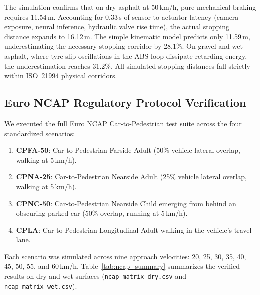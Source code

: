 \documentclass[3p,twocolumn]{elsarticle}
\begin{document}
The simulation confirms that on dry asphalt at 50\,km/h, pure mechanical braking requires 11.54\,m. Accounting for 0.33\,s of sensor-to-actuator latency (camera exposure, neural inference, hydraulic valve rise time), the actual stopping distance expands to 16.12\,m. The simple kinematic model predicts only 11.59\,m, underestimating the necessary stopping corridor by 28.1\%. On gravel and wet asphalt, where tyre slip oscillations in the ABS loop dissipate retarding energy, the underestimation reaches 31.2\%. All simulated stopping distances fall strictly within ISO~21994 physical corridors.

\subsection{Euro NCAP Regulatory Protocol Verification}
We executed the full Euro NCAP Car-to-Pedestrian test suite across the four standardized scenarios:
\begin{enumerate}
  \item \textbf{CPFA-50}: Car-to-Pedestrian Farside Adult (50\% vehicle lateral overlap, walking at 5\,km/h).
  \item \textbf{CPNA-25}: Car-to-Pedestrian Nearside Adult (25\% vehicle lateral overlap, walking at 5\,km/h).
  \item \textbf{CPNC-50}: Car-to-Pedestrian Nearside Child emerging from behind an obscuring parked car (50\% overlap, running at 5\,km/h).
  \item \textbf{CPLA}: Car-to-Pedestrian Longitudinal Adult walking in the vehicle's travel lane.
\end{enumerate}

Each scenario was simulated across nine approach velocities: 20, 25, 30, 35, 40, 45, 50, 55, and 60\,km/h. Table~\ref{tab:ncap_summary} summarizes the verified results on dry and wet surfaces (\texttt{ncap\_matrix\_dry.csv} and \texttt{ncap\_matrix\_wet.csv}).

\begin{table}[!t]
\caption{Euro NCAP Test Matrix Outcome Summary Across 36 Simulated Cases}
\label{tab:ncap_summary}
\centering
\small
{}%
\end{table}
\end{document}
